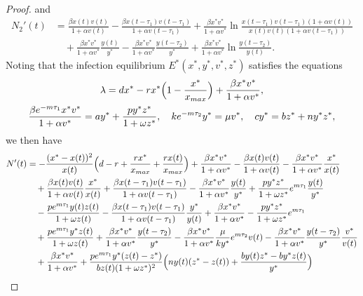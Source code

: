 \documentclass[10pt,a4paper]{amsart}
\numberwithin{equation}{section}
\begin{document}
\begin{proof}
and
\begin{align*}
N_{2}'(t)
&= \frac{\beta x(t)v(t)}{1+\alpha v(t)}
 -\frac{\beta x(t-\tau_{1})v(t-\tau_{1})}{1+\alpha v(t-\tau_{1})}
 +\frac{\beta x^{*}v^{*}}{1+\alpha v^{*}}
 \ln\frac{x(t-\tau_{1})v(t-\tau_{1})(1+\alpha v(t))}{x(t)v(t)(1+\alpha v(t-\tau_{1}))}\\
&\quad + \frac{\beta x^{*}v^{*}}{1+\alpha v^{*}}\frac{y(t)}{y^{*}}
-\frac{\beta x^{*}v^{*}}{1+\alpha v^{*}}\frac{y(t-\tau_{2})}{y^{*}}
+\frac{\beta x^{*}v^{*}}{1+\alpha v^{*}}\ln\frac{y(t-\tau_{2})}{y(t)}.
\end{align*}
Noting that the infection equilibrium $E^{*}(x^{*}, y^{*}, v^{*}, z^{*})$ 
satisfies the equations
\begin{gather*}
\lambda=dx^{*}-rx^{*}\Big(1-{\frac{x^{*}}{x_{\rm max}}}\Big)
+{\frac{\beta x^{*}v^{*}}{1+\alpha v^{*}}}, \\
{\frac{\beta e^{-m\tau_1}x^{*}v^{*}}{1+\alpha v^{*}}}=ay^{*}
 +{\frac{py^{*}z^{*}}{1+\omega z^{*}}},\quad
k e^{-m\tau_2}y^{*}=\mu v^{*},\quad
 cy^{*}=bz^{*}+ny^{*}z^{*},
\end{gather*}	
we then have
\begin{align*}
N'(t)
&= -\frac{(x^{*}-x(t))^{2}}{x(t)}\Big(d-r+\frac{rx^{*}}{x_{\rm max}}+\frac{rx(t)}{x_{\rm max}}\Big)
 +\frac{\beta x^{*}v^{*}}{1+\alpha v^{*}}-\frac{\beta x(t)v(t)}{1+\alpha v(t)}
 -\frac{\beta x^{*}v^{*}}{1+\alpha v^{*}}\frac{x^{*}}{x(t)} \\
&\quad +\frac{\beta x(t)v(t)}{1+\alpha v(t)}\frac{x^{*}}{x(t)}
 +\frac{\beta x(t-\tau_{1})v(t-\tau_{1})}{1+\alpha v(t-\tau_{1})}
 -\frac{\beta x^{*}v^{*}}{1+\alpha v^{*}}\frac{y(t)}{y^{*}}
 +\frac{py^{*}z^{*}}{1+\omega z^{*}}e^{m\tau_1}\frac{y(t)}{y^{*}} \\
&\quad -\frac{pe^{m\tau_{1}} y(t)z(t)}{1+\omega z(t)}
 -\frac{\beta x(t-\tau_{1})v(t-\tau_{1})}{1+\alpha v(t-\tau_{1})}\frac{y^{*}}{y(t)}
 +\frac{\beta x^{*}v^{*}}{1+\alpha v^{*}}-\frac{py^{*}z^{*}}{1+\omega z^{*}}e^{m\tau_1} \\
&\quad +\frac{pe^{m\tau_{1}} y^{*}z(t)}{1+\omega z(t)}
 +\frac{\beta x^{*}v^{*}}{1+\alpha v^{*}}\frac{y(t-\tau_{2})}{y^{*}}
 -\frac{\beta x^{*}v^{*}}{1+\alpha v^{*}}\frac{\mu}{ky^{*}}e^{m\tau_2}v(t)
 -\frac{\beta x^{*}v^{*}}{1+\alpha v^{*}}\frac{y(t-\tau_{2})}{y^{*}}\frac{v^{*}}{v(t)} \\
&\quad +\frac{\beta x^{*}v^{*}}{1+\alpha v^{*}}+\frac{pe^{m\tau_1}y^{*}(z(t)
 -z^{*})}{bz(t)(1+\omega z^{*})^{2}}\Big(ny(t)(z^{*}-z(t))+\frac{by(t)z^{*}
 -by^{*}z(t)}{y^{*}}\Big)\\

\end{align*}
\end{proof}
\end{document}
